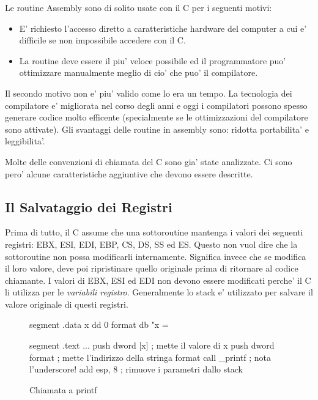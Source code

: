 Le routine Assembly sono di solito usate con il C per i seguenti motivi:
\begin{itemize}
\item E' richiesto l'accesso diretto a caratteristiche hardware del 
      computer a cui e' difficile se non impossibile accedere con il C.
\item La routine deve essere il piu' veloce possibile ed il programmatore
      puo' ottimizzare manualmente meglio di cio' che puo' il compilatore.
\end{itemize}

Il secondo motivo non e' piu' valido come lo era un tempo. La tecnologia
dei compilatore e' migliorata nel corso degli anni e oggi i compilatori
possono spesso generare codice molto efficente (specialmente se le
ottimizzazioni del compilatore sono attivate). Gli svantaggi delle 
routine in assembly sono: ridotta portabilita' e leggibilita'.

Molte delle convenzioni di chiamata del C sono gia' state analizzate. Ci sono
pero' alcune caratteristiche aggiuntive che devono essere descritte.

\subsection{Il Salvataggio dei Registri}
Prima di tutto,
il C assume che una sottoroutine mantenga i valori dei seguenti registri:
EBX, ESI, EDI, EBP, CS, DS, SS ed ES. Questo non vuol dire che la
sottoroutine non possa modificarli internamente. Significa invece che se
modifica il loro valore, deve poi ripristinare quello originale prima
di ritornare al codice chiamante. I valori di EBX, ESI ed EDI non devono 
essere modificati perche' il C li utilizza per le \emph{variabili registro}.
Generalmente lo stack e' utilizzato per salvare il valore originale di 
questi registri. 

\begin{figure}[t]
\begin{AsmCodeListing}[frame=single]
segment .data
x            dd     0
format       db     "x = %

segment .text
...
      push   dword [x]     ; mette il valore di x
      push   dword format  ; mette l'indirizzo della stringa format
      call   _printf       ; nota l'underscore!
      add    esp, 8        ; rimuove i parametri dallo stack
\end{AsmCodeListing}
\caption{Chiamata a {\code printf} \label{fig:Cprintf}}
\end{figure}

